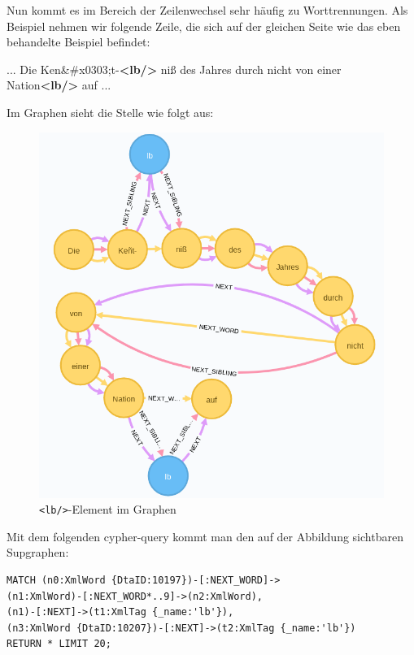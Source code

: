 \documentclass[12pt,ngerman,]{article}
\newenvironment{Shaded}{}{}
\newcommand{\KeywordTok}[1]{\textcolor[rgb]{0.00,0.44,0.13}{\textbf{#1}}}
\newcommand{\DecValTok}[1]{\textcolor[rgb]{0.25,0.63,0.44}{#1}}
\newcommand{\NormalTok}[1]{#1}
\begin{document}
Nun kommt es im Bereich der Zeilenwechsel sehr häufig zu Worttrennungen.
Als Beispiel nehmen wir folgende Zeile, die sich auf der gleichen Seite
wie das eben behandelte Beispiel befindet:

\begin{Shaded}
\begin{Highlighting}[]
\NormalTok{... Die Ken}\DecValTok{&#x0303;}\NormalTok{t-}\KeywordTok{<lb/>}
\NormalTok{niß des Jahres durch nicht von einer Nation}\KeywordTok{<lb/>}
\NormalTok{auf ...}
\end{Highlighting}
\end{Shaded}

Im Graphen sieht die Stelle wie folgt aus:

\begin{figure}
\centering
\includegraphics{Bilder/TEI2Graph/lb mit Worttrennung im Graphen.png}
\caption{\texttt{\textless{}lb/\textgreater{}}-Element im Graphen}
\end{figure}

Mit dem folgenden cypher-query kommt man den auf der Abbildung
sichtbaren Supgraphen:

\begin{verbatim}
MATCH (n0:XmlWord {DtaID:10197})-[:NEXT_WORD]->
(n1:XmlWord)-[:NEXT_WORD*..9]->(n2:XmlWord),
(n1)-[:NEXT]->(t1:XmlTag {_name:'lb'}),
(n3:XmlWord {DtaID:10207})-[:NEXT]->(t2:XmlTag {_name:'lb'})
RETURN * LIMIT 20;
\end{verbatim}
\end{document}
